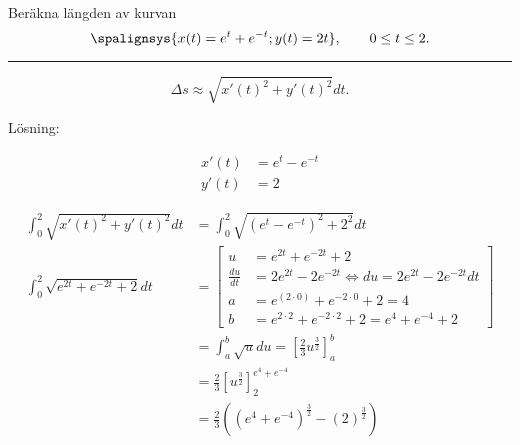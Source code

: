 \documentclass[11pt]{article}
\begin{document}
Beräkna längden av kurvan
\[
    \spalignsys{
        x(t) = e^t + e^{-t};
        y(t) = 2t
    }
    ,\qquad
    0 \leq t \leq 2.
\]

\noindent\rule{\textwidth}{0.5pt}

\begin{equation}
    \Delta s \approx \sqrt{x'(t)^2 + y'(t)^2}dt.
    \label{eq:kurvlangd}
\end{equation}

Lösning:

\begin{align}
    x'(t) &= e^t - e^{-t}\\
    y'(t) &= 2
\end{align}

\begin{align}
    \int_0^2 \sqrt{x'(t)^2 + y'(t)^2} dt &= \int_0^2 \sqrt{\left(e^t - e^{-t}\right)^2 + 2^2} dt \\
    \int_0^2 \sqrt{e^{2t} + e^{-2t} + 2} dt &= \left[\begin{aligned}
        u &= e^{2t} + e^{-2t} + 2\\
        \frac{du}{dt} &= 2e^{2t} - 2e^{-2t} \Leftrightarrow du = 2e^{2t} - 2e^{-2t}dt\\
        a &= e^(2 \cdot 0) + e^{-2 \cdot 0} + 2 = 4\\
        b &= e^{2 \cdot 2} + e^{-2 \cdot 2} + 2 = e^4 + e^{-4} + 2
    \end{aligned}\right]\\
    &= \int_a^b \sqrt{u} du = \left[\frac{2}{3}u^{\frac{3}{2}}\right]_a^b\\
    &= \frac{2}{3}\left[u^{\frac{3}{2}}\right]_2^{e^4 + e^{-4}} \\
    &= \frac{2}{3}\left(\left(e^4 + e^{-4}\right)^{\frac{3}{2}} - \left(2\right)^{\frac{3}{2}}\right)
\end{align}
\end{document}
